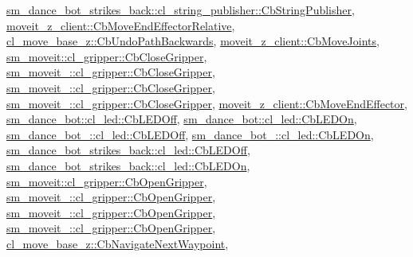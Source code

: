 \hyperlink{classsm__dance__bot__strikes__back_1_1cl__string__publisher_1_1CbStringPublisher_ae4aa02553119822c583bb2abb44c810c}{sm\+\_\+dance\+\_\+bot\+\_\+strikes\+\_\+back\+::cl\+\_\+string\+\_\+publisher\+::\+Cb\+String\+Publisher}, \hyperlink{classmoveit__z__client_1_1CbMoveEndEffectorRelative_af23c69f0919a2f62fbddf0e1dbdb83e1}{moveit\+\_\+z\+\_\+client\+::\+Cb\+Move\+End\+Effector\+Relative}, \hyperlink{classcl__move__base__z_1_1CbUndoPathBackwards_a20cee921ad92db16f8d17c3c3b9c2daf}{cl\+\_\+move\+\_\+base\+\_\+z\+::\+Cb\+Undo\+Path\+Backwards}, \hyperlink{classmoveit__z__client_1_1CbMoveJoints_a104abb9c8f8ebb04a6e5c8e84b473add}{moveit\+\_\+z\+\_\+client\+::\+Cb\+Move\+Joints}, \hyperlink{classsm__moveit_1_1cl__gripper_1_1CbCloseGripper_a643cca41b7a62a3c2b26e07ab7edb05a}{sm\+\_\+moveit\+::cl\+\_\+gripper\+::\+Cb\+Close\+Gripper}, \hyperlink{classsm__moveit__2_1_1cl__gripper_1_1CbCloseGripper_a6dfd0cf0abefda948c23767508cd8d86}{sm\+\_\+moveit\+\_\+::cl\+\_\+gripper\+::\+Cb\+Close\+Gripper}, \hyperlink{classsm__moveit__3_1_1cl__gripper_1_1CbCloseGripper_ad78af2da289e83bd9a7087bc31b14ecb}{sm\+\_\+moveit\+\_\+::cl\+\_\+gripper\+::\+Cb\+Close\+Gripper}, \hyperlink{classsm__moveit__4_1_1cl__gripper_1_1CbCloseGripper_a9c907d899c60fff004eb9f2d5e29913b}{sm\+\_\+moveit\+\_\+::cl\+\_\+gripper\+::\+Cb\+Close\+Gripper}, \hyperlink{classmoveit__z__client_1_1CbMoveEndEffector_af3fdc6c596da7792cfc9bbef13cb02fc}{moveit\+\_\+z\+\_\+client\+::\+Cb\+Move\+End\+Effector}, \hyperlink{classsm__dance__bot_1_1cl__led_1_1CbLEDOff_ad0db28985308dd486943d1f511c655ad}{sm\+\_\+dance\+\_\+bot\+::cl\+\_\+led\+::\+Cb\+L\+E\+D\+Off}, \hyperlink{classsm__dance__bot_1_1cl__led_1_1CbLEDOn_a60a82058c585b4d0398b531c1e1bdf0b}{sm\+\_\+dance\+\_\+bot\+::cl\+\_\+led\+::\+Cb\+L\+E\+D\+On}, \hyperlink{classsm__dance__bot__2_1_1cl__led_1_1CbLEDOff_a6ca7b3ba30347c4be33d3b4946009325}{sm\+\_\+dance\+\_\+bot\+\_\+::cl\+\_\+led\+::\+Cb\+L\+E\+D\+Off}, \hyperlink{classsm__dance__bot__2_1_1cl__led_1_1CbLEDOn_a461d3e1829d785ab490fce9827868e39}{sm\+\_\+dance\+\_\+bot\+\_\+::cl\+\_\+led\+::\+Cb\+L\+E\+D\+On}, \hyperlink{classsm__dance__bot__strikes__back_1_1cl__led_1_1CbLEDOff_a6b4ac6e1c516ced8515e6b6641c5d063}{sm\+\_\+dance\+\_\+bot\+\_\+strikes\+\_\+back\+::cl\+\_\+led\+::\+Cb\+L\+E\+D\+Off}, \hyperlink{classsm__dance__bot__strikes__back_1_1cl__led_1_1CbLEDOn_aadafa99cd7c683a9d1ae59b5158826d9}{sm\+\_\+dance\+\_\+bot\+\_\+strikes\+\_\+back\+::cl\+\_\+led\+::\+Cb\+L\+E\+D\+On}, \hyperlink{classsm__moveit_1_1cl__gripper_1_1CbOpenGripper_a16cdbe39be1b1789880bae04fa87531c}{sm\+\_\+moveit\+::cl\+\_\+gripper\+::\+Cb\+Open\+Gripper}, \hyperlink{classsm__moveit__2_1_1cl__gripper_1_1CbOpenGripper_ab72fa9429628aa78b2bb1276ff7d390a}{sm\+\_\+moveit\+\_\+::cl\+\_\+gripper\+::\+Cb\+Open\+Gripper}, \hyperlink{classsm__moveit__3_1_1cl__gripper_1_1CbOpenGripper_a91085c752bc1d9cfadd65031b8b64c46}{sm\+\_\+moveit\+\_\+::cl\+\_\+gripper\+::\+Cb\+Open\+Gripper}, \hyperlink{classsm__moveit__4_1_1cl__gripper_1_1CbOpenGripper_ab5355c50786f7f598ee6ca5650d56fbe}{sm\+\_\+moveit\+\_\+::cl\+\_\+gripper\+::\+Cb\+Open\+Gripper}, \hyperlink{classcl__move__base__z_1_1CbNavigateNextWaypoint_a1a848f7bfedd23fea7de59a940257b05}{cl\+\_\+move\+\_\+base\+\_\+z\+::\+Cb\+Navigate\+Next\+Waypoint}, 